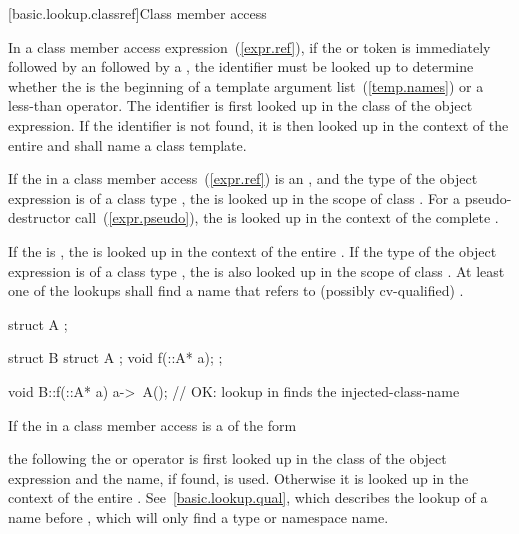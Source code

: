 [basic.lookup.classref]{Class member access}

\pnum
{}%
In a class member access expression~(\ref{expr.ref}), if the 
or \tcode{->} token is immediately followed by an 
followed by a \tcode{<}, the identifier must be looked up to determine
whether the \tcode{<} is the beginning of a template argument
list~(\ref{temp.names}) or a less-than operator. The identifier is first
looked up in the class of the object expression. If the identifier is
not found, it is then looked up in the context of the entire
 and shall name a class template.

\pnum
If the  in a class member
access~(\ref{expr.ref}) is an , and the type of
the object expression is of a class type , the
 is looked up in the scope of class .
For a pseudo-destructor call~(\ref{expr.pseudo}),
the  is looked up in the context of the complete
.

\pnum
If the  is , the
 is looked up in the context of the entire
. If the type  of the object
expression is of a class type , the  is
also looked up in the scope of class . At least one of the
lookups shall find a name that refers to (possibly cv-qualified)
. \enterexample

\begin{codeblock}
struct A { };

struct B {
  struct A { };
  void f(::A* a);
};

void B::f(::A* a) {
  a->~A();                      // OK: lookup in  finds the injected-class-name
}
\end{codeblock}\exitexample

\pnum
If the  in a class member access is a
 of the form

\begin{indented}
\end{indented}

the  following the  or
\tcode{->} operator is
first looked up in the class of the object expression and the name, if found,
is used. Otherwise it is looked up in the context of the entire
. \enternote See~\ref{basic.lookup.qual}, which
describes the lookup of a name before \tcode{::}, which will only find a type
or namespace name. \exitnote

